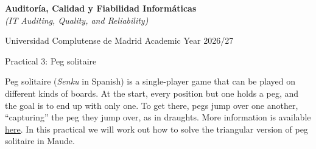 

\usepackage{pgf}
\usepackage{tikz}
\usepackage{url}
\usepackage{hyperref}



\begin{center}
{\Large\textbf{Auditor\'ia, Calidad y Fiabilidad Inform\'aticas}}\\[2pt]
\textit{(IT Auditing, Quality, and Reliability)}
\smallskip

\large
Universidad Complutense de Madrid \qquad Academic Year 2026/27
\medskip

Practical 3: Peg solitaire\hfill\mbox{}

\noindent\hrulefill
\end{center}

Peg solitaire (\emph{Senku} in Spanish) is a single-player game that can be
played on different kinds of boards. At the start, every position but one
holds a peg, and the goal is to end up with only one. To get there, pegs jump
over one another, ``capturing'' the peg they jump over, as in draughts.
%
More information is available
\href{https://en.wikipedia.org/wiki/Peg_solitaire}{\underline{here}}.
%
In this practical we will work out how to solve the triangular version of
peg solitaire in Maude.

